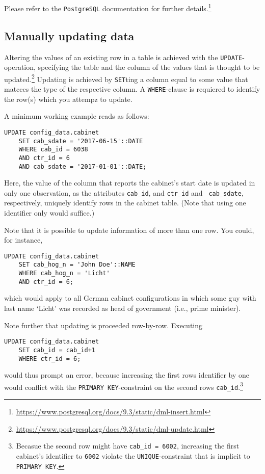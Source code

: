 Please refer to the \texttt{PostgreSQL} documentation for further details.\footnote{\url{https://www.postgresql.org/docs/9.3/static/dml-insert.html}}



\subsection{Manually updating data}

Altering the values of an existing row in a table is achieved with the \texttt{UPDATE}-operation, specifying the table and the column of the values that is thought to be updated.\footnote{\url{https://www.postgresql.org/docs/9.3/static/dml-update.html}}
Updating is achieved by \texttt{SET}ting a column equal to some value that matcces the type of the respective column.
A \texttt{WHERE}-clause is requiered to identify the row(s) which you attempz to update. 

A minimum working example reads as follows:
\begin{lstlisting}[language=postgreSQL]
UPDATE config_data.cabinet 
	SET cab_sdate = '2017-06-15'::DATE 
	WHERE cab_id = 6038 
	AND ctr_id = 6 
	AND cab_sdate = '2017-01-01'::DATE;
\end{lstlisting}

Here, the value of the column that reports the cabinet's start date is updated in only one observation, as the attributes \texttt{cab\_id}, and \texttt{ctr\_id} and \texttt{ cab\_sdate}, respectively, uniquely identify rows in the cabinet table. (Note that using one identifier only would suffice.)

Note that it is possible to update information of more than one row. 
You could, for instance, 
\begin{lstlisting}[language=postgreSQL]
UPDATE config_data.cabinet 
	SET cab_hog_n = 'John Doe'::NAME 
	WHERE cab_hog_n = 'Licht'
	AND ctr_id = 6;
\end{lstlisting}
which would apply to all German cabinet configurations in which some guy with last name `Licht' was recorded as head of government (i.e., prime minister).

Note further that updating is proceeded row-by-row. Executing
\begin{lstlisting}[language=postgreSQL]
UPDATE config_data.cabinet 
	SET cab_id = cab_id+1
	WHERE ctr_id = 6;
\end{lstlisting}
would thus prompt an error, because increasing the first rows identifier by one would conflict with the \texttt{PRIMARY KEY}-constraint on the second rows \texttt{cab\_id}.\footnote{Becasue the second row might have \texttt{cab\_id = 6002}, increasing the first cabinet's identifier to \texttt{6002} violate the \texttt{UNIQUE}-constraint that is implicit to \texttt{PRIMARY KEY}.}



